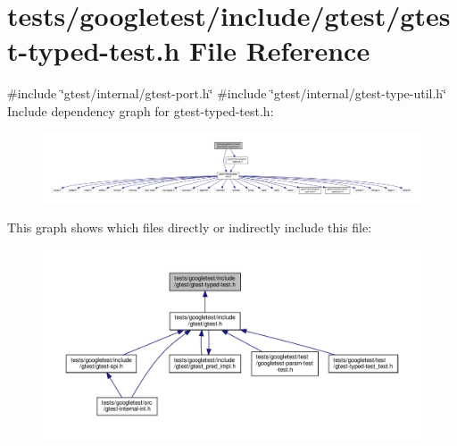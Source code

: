 \hypertarget{gtest-typed-test_8h}{}\section{tests/googletest/include/gtest/gtest-\/typed-\/test.h File Reference}
\label{gtest-typed-test_8h}
{\ttfamily \#include \char`\"{}gtest/internal/gtest-\/port.\+h\char`\"{}}\newline
{\ttfamily \#include \char`\"{}gtest/internal/gtest-\/type-\/util.\+h\char`\"{}}\newline
Include dependency graph for gtest-\/typed-\/test.h\+:\nopagebreak
\begin{figure}[H]
\begin{center}
\leavevmode
\includegraphics[width=350pt]{gtest-typed-test_8h__incl}
\end{center}
\end{figure}
This graph shows which files directly or indirectly include this file\+:\nopagebreak
\begin{figure}[H]
\begin{center}
\leavevmode
\includegraphics[width=350pt]{gtest-typed-test_8h__dep__incl}
\end{center}
\end{figure}
